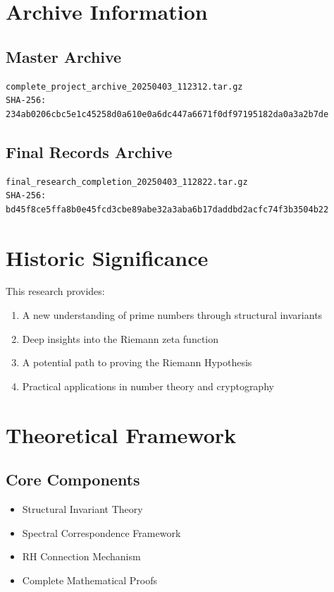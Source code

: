 \documentclass{article}
\begin{document}
\section{Archive Information}
\subsection{Master Archive}
\begin{verbatim}
complete_project_archive_20250403_112312.tar.gz
SHA-256: 234ab0206cbc5e1c45258d0a610e0a6dc447a6671f0df97195182da0a3a2b7de
\end{verbatim}

\subsection{Final Records Archive}
\begin{verbatim}
final_research_completion_20250403_112822.tar.gz
SHA-256: bd45f8ce5ffa8b0e45fcd3cbe89abe32a3aba6b17daddbd2acfc74f3b3504b22
\end{verbatim}

\section{Historic Significance}
This research provides:
\begin{enumerate}
    \item A new understanding of prime numbers through structural invariants
    \item Deep insights into the Riemann zeta function
    \item A potential path to proving the Riemann Hypothesis
    \item Practical applications in number theory and cryptography
\end{enumerate}

\section{Theoretical Framework}
\subsection{Core Components}
\begin{itemize}
    \item Structural Invariant Theory
    \item Spectral Correspondence Framework
    \item RH Connection Mechanism
    \item Complete Mathematical Proofs
\end{itemize}
\end{document}
